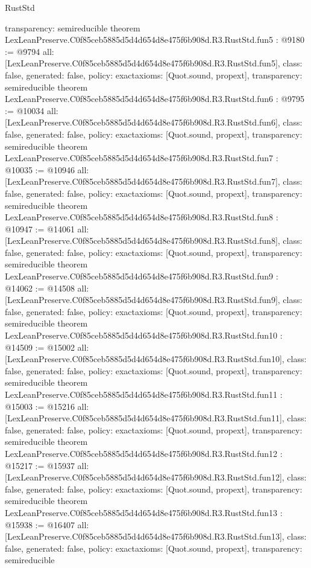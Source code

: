 \begin{lexlean}{RustStd}
\begin{coremodule}
{  transparency: semireducible
}
theorem LexLeanPreserve.C0f85ceb5885d5d4d654d8e475f6b908d.R3.RustStd.fun5 : @9180 := @9794 {
  all: [LexLeanPreserve.C0f85ceb5885d5d4d654d8e475f6b908d.R3.RustStd.fun5],
  class: false,
  generated: false,
  policy: exact{axioms: [Quot.sound, propext]},
  transparency: semireducible
}
theorem LexLeanPreserve.C0f85ceb5885d5d4d654d8e475f6b908d.R3.RustStd.fun6 : @9795 := @10034 {
  all: [LexLeanPreserve.C0f85ceb5885d5d4d654d8e475f6b908d.R3.RustStd.fun6],
  class: false,
  generated: false,
  policy: exact{axioms: [Quot.sound, propext]},
  transparency: semireducible
}
theorem LexLeanPreserve.C0f85ceb5885d5d4d654d8e475f6b908d.R3.RustStd.fun7 : @10035 := @10946 {
  all: [LexLeanPreserve.C0f85ceb5885d5d4d654d8e475f6b908d.R3.RustStd.fun7],
  class: false,
  generated: false,
  policy: exact{axioms: [Quot.sound, propext]},
  transparency: semireducible
}
theorem LexLeanPreserve.C0f85ceb5885d5d4d654d8e475f6b908d.R3.RustStd.fun8 : @10947 := @14061 {
  all: [LexLeanPreserve.C0f85ceb5885d5d4d654d8e475f6b908d.R3.RustStd.fun8],
  class: false,
  generated: false,
  policy: exact{axioms: [Quot.sound, propext]},
  transparency: semireducible
}
theorem LexLeanPreserve.C0f85ceb5885d5d4d654d8e475f6b908d.R3.RustStd.fun9 : @14062 := @14508 {
  all: [LexLeanPreserve.C0f85ceb5885d5d4d654d8e475f6b908d.R3.RustStd.fun9],
  class: false,
  generated: false,
  policy: exact{axioms: [Quot.sound, propext]},
  transparency: semireducible
}
theorem LexLeanPreserve.C0f85ceb5885d5d4d654d8e475f6b908d.R3.RustStd.fun10 : @14509 := @15002 {
  all: [LexLeanPreserve.C0f85ceb5885d5d4d654d8e475f6b908d.R3.RustStd.fun10],
  class: false,
  generated: false,
  policy: exact{axioms: [Quot.sound, propext]},
  transparency: semireducible
}
theorem LexLeanPreserve.C0f85ceb5885d5d4d654d8e475f6b908d.R3.RustStd.fun11 : @15003 := @15216 {
  all: [LexLeanPreserve.C0f85ceb5885d5d4d654d8e475f6b908d.R3.RustStd.fun11],
  class: false,
  generated: false,
  policy: exact{axioms: [Quot.sound, propext]},
  transparency: semireducible
}
theorem LexLeanPreserve.C0f85ceb5885d5d4d654d8e475f6b908d.R3.RustStd.fun12 : @15217 := @15937 {
  all: [LexLeanPreserve.C0f85ceb5885d5d4d654d8e475f6b908d.R3.RustStd.fun12],
  class: false,
  generated: false,
  policy: exact{axioms: [Quot.sound, propext]},
  transparency: semireducible
}
theorem LexLeanPreserve.C0f85ceb5885d5d4d654d8e475f6b908d.R3.RustStd.fun13 : @15938 := @16407 {
  all: [LexLeanPreserve.C0f85ceb5885d5d4d654d8e475f6b908d.R3.RustStd.fun13],
  class: false,
  generated: false,
  policy: exact{axioms: [Quot.sound, propext]},
  transparency: semireducible
}
\end{coremodule}
\end{lexlean}
